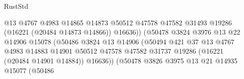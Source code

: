 \begin{lexlean}{RustStd}
\begin{coremodule}
                                                  @13
                                                  @4767
                                                  @4983
                                                  @14865
                                                  @14873
                                                  @50512
                                                  @47578
                                                  @47582
                                                  @31493
                                                  @19286
                                                  (@16221 (@20484 @14873 @14866))
                                                  @16636))
                                              (@50478
                                                @3824
                                                @3976
                                                @13
                                                @22
                                                @14906
                                                @15078
                                                (@50486
                                                  @3824
                                                  @13
                                                  @14906
                                                  (@50494
                                                    @421
                                                    @37
                                                    @13
                                                    @4767
                                                    @4983
                                                    @14883
                                                    @14901
                                                    @50512
                                                    @47578
                                                    @47582
                                                    @31737
                                                    @19286
                                                    (@16221 (@20484 @14901 @14884))
                                                    @16636))
                                                (@50478
                                                  @3826
                                                  @3975
                                                  @13
                                                  @21
                                                  @14935
                                                  @15077
                                                  (@50486

\end{coremodule}
\end{lexlean}
